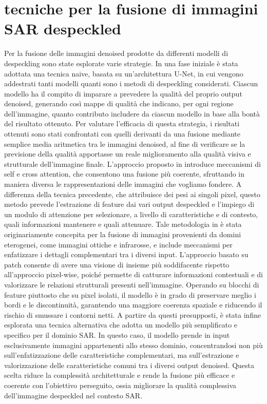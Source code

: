 
\chapter{tecniche per la fusione di immagini SAR despeckled}
Per la fusione delle immagini denoised prodotte da differenti modelli di despeckling sono state esplorate varie strategie.
In una fase iniziale è stata adottata una tecnica naive, basata su un’architettura U-Net, in cui vengono addestrati 
tanti modelli quanti sono i metodi di despeckling considerati.
Ciascun modello ha il compito di imparare a prevedere la qualità del proprio output denoised, generando così mappe 
di qualità che indicano, per ogni regione dell’immagine, quanto contributo includere da ciascun modello in 
base alla bontà del risultato ottenuto.
Per valutare l’efficacia di questa strategia, i risultati ottenuti sono stati confrontati con quelli derivanti 
da una fusione mediante semplice media aritmetica tra le immagini denoised, al fine di verificare se 
la previsione della qualità apportasse un reale miglioramento alla qualità visiva e strutturale dell’immagine finale.
L’approccio proposto in \cite{li2024crossfuse} introduce meccanismi di self e cross attention, 
che consentono una fusione più coerente, sfruttando in maniera diversa le rappresentazioni delle immagini che vogliamo fondere.
A differenza della tecnica precedente, che attribuisce dei pesi ai singoli pixel, questo metodo prevede 
l’estrazione di feature dai vari output despeckled e l’impiego di un modulo di attenzione per selezionare, 
a livello di caratteristiche e di contesto, quali informazioni mantenere e quali attenuare.
Tale metodologia in \cite{li2024crossfuse} è stata originariamente concepita per la fusione di immagini provenienti da domini eterogenei, 
come immagini ottiche e infrarosse, e include meccanismi per enfatizzare i dettagli complementari tra i diversi input.
L’approccio basato su patch consente di avere una visione di insieme più soddifacente rispetto all'approccio pixel-wise, poiché permette di catturare informazioni 
contestuali e di valorizzare le relazioni strutturali presenti nell’immagine.
Operando su blocchi di feature piuttosto che su pixel isolati, il modello è in grado di preservare meglio i bordi e le 
discontinuità, garantendo una maggiore coerenza spaziale e riducendo il rischio di smussare i contorni netti.
A partire da questi presupposti, è stata infine esplorata una tecnica alternativa che adotta un modello più semplificato 
e specifico per il dominio SAR.
In questo caso, il modello prende in input esclusivamente immagini appartenenti allo stesso dominio, concentrandosi 
non più sull’enfatizzazione delle caratteristiche complementari, ma sull’estrazione e valorizzazione 
delle caratteristiche comuni tra i diversi output denoised.
Questa scelta riduce la complessità architetturale e rende la fusione più efficace e coerente con l’obiettivo perseguito, 
ossia migliorare la qualità complessiva dell’immagine despeckled nel contesto SAR.


